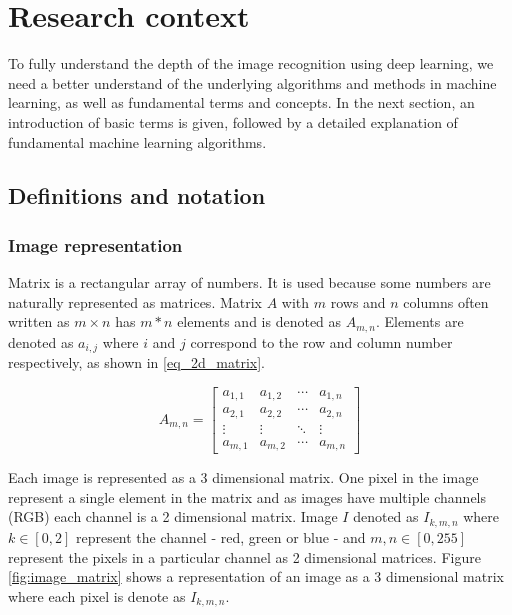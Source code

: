 \documentclass[times, utf8, diplomski]{fer}
\begin{document}
\chapter{Research context}
To fully understand the depth of the image recognition using deep learning, we need a better understand of the underlying algorithms and methods in machine learning, as well as fundamental terms and concepts. In the next section, an introduction of basic terms is given, followed by a detailed explanation of fundamental machine learning algorithms.

\section{Definitions and notation}

\subsection{Image representation}
Matrix is a rectangular array of numbers. It is used because some numbers are naturally represented as matrices. Matrix $A$ with $m$ rows and $n$ columns often written as $m \times n$ has $m*n$ elements and is denoted as $A_{m,n}$. Elements are denoted as $a_{i,j}$ where $i$ and $j$ correspond to the row and column number respectively, as shown in \ref{eq_2d_matrix}. 

\begin{equation} \label{eq_2d_matrix}
A_{m,n} = 
 \begin{bmatrix}
  a_{1,1} & a_{1,2} & \cdots & a_{1,n} \\
  a_{2,1} & a_{2,2} & \cdots & a_{2,n} \\
  \vdots  & \vdots  & \ddots & \vdots  \\
  a_{m,1} & a_{m,2} & \cdots & a_{m,n} 
 \end{bmatrix}
\end{equation}


Each image is represented as a 3 dimensional matrix. One pixel in the image represent a single element in the matrix and as images have multiple channels (RGB) each channel is a 2 dimensional matrix. Image $I$ denoted as $I_{k,m,n}$ where $k\in[0,2]$ represent the channel - red, green or blue - and $m,n\in[0,255]$ represent the pixels in a particular channel as 2 dimensional matrices. Figure \ref{fig:image_matrix} shows a representation of an image as a 3 dimensional matrix where each pixel is denote as $I_{k,m,n}$.
\end{document}
